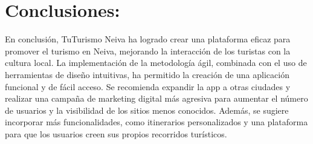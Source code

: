 \documentclass{article}
\begin{document}
\section{Conclusiones:}
En conclusión, TuTurismo Neiva ha logrado crear una plataforma eficaz para
promover el turismo en Neiva, mejorando la interacción de los turistas con la
cultura local. La implementación de la metodología ágil, combinada con el uso de
herramientas de diseño intuitivas, ha permitido la creación de una aplicación
funcional y de fácil acceso. Se recomienda expandir la app a otras ciudades y
realizar una campaña de marketing digital más agresiva para aumentar el número
de usuarios y la visibilidad de los sitios menos conocidos. Además, se sugiere
incorporar más funcionalidades, como itinerarios personalizados y una plataforma
para que los usuarios creen sus propios recorridos turísticos.
\end{document}
